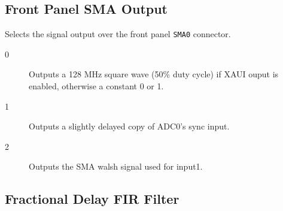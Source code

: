 \documentclass[12pt]{article}
\begin{document}
  \subsection{Front Panel SMA Output}
\begin{description}

 Selects the signal output over the front panel \verb|SMA0|
connector.

\begin{description}

\item[0] Outputs a 128 MHz square wave (50\% duty cycle) if XAUI ouput is
enabled, otherwise a constant 0 or 1.

\item[1] Outputs a slightly delayed copy of ADC0's sync
input.

\item[2] Outputs the SMA walsh signal used for input1.

\end{description}
\end{description}

  \subsection{Fractional Delay FIR Filter}
\end{document}
